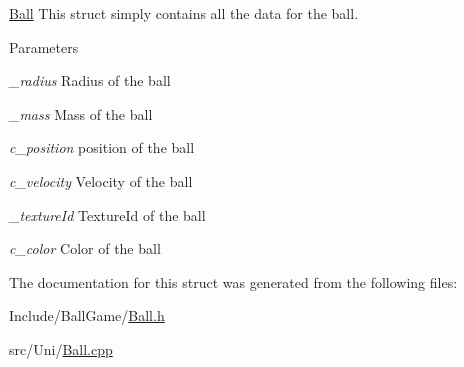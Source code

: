 \hyperlink{structBall}{Ball} This struct simply contains all the data for the ball. 
\begin{DoxyParams}{Parameters}
\item[{\em \_\-radius}]Radius of the ball \item[{\em \_\-mass}]Mass of the ball \item[{\em c\_\-position}]position of the ball \item[{\em c\_\-velocity}]Velocity of the ball \item[{\em \_\-textureId}]TextureId of the ball \item[{\em c\_\-color}]Color of the ball \end{DoxyParams}


The documentation for this struct was generated from the following files:\begin{DoxyCompactItemize}
\item 
Include/BallGame/\hyperlink{Ball_8h}{Ball.h}\item 
src/Uni/\hyperlink{Ball_8cpp}{Ball.cpp}\end{DoxyCompactItemize}
